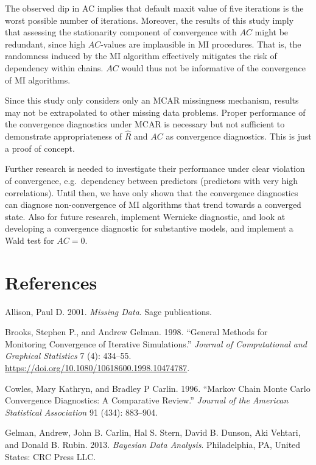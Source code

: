 \documentclass[
  Royal, times, sageapa]{sagej}
\begin{document}
The observed dip in AC implies that default maxit value of five
iterations is the worst possible number of iterations. Moreover, the
results of this study imply that assessing the stationarity component of
convergence with \(AC\) might be redundant, since high \(AC\)-values are
implausible in MI procedures. That is, the randomness induced by the MI
algorithm effectively mitigates the risk of dependency within chains.
\(AC\) would thus not be informative of the convergence of MI
algorithms.

Since this study only considers only an MCAR missingness mechanism,
results may not be extrapolated to other missing data problems. Proper
performance of the convergence diagnostics under MCAR is necessary but
not sufficient to demonstrate appropriateness of \(\widehat{R}\) and
\(AC\) as convergence diagnostics. This is just a proof of concept.

Further research is needed to investigate their performance under clear
violation of convergence, e.g.~dependency between predictors (predictors
with very high correlations). Until then, we have only shown that the
convergence diagnostics can diagnose non-convergence of MI algorithms
that trend towards a converged state. Also for future research,
implement Wernicke diagnostic, and look at developing a convergence
diagnostic for substantive models, and implement a Wald test for
\(AC = 0\).

\hypertarget{references}{%
\section*{References}\label{references}}

\hypertarget{refs}{}
\leavevmode\hypertarget{ref-alli02}{}%
Allison, Paul D. 2001. \emph{Missing Data}. Sage publications.

\leavevmode\hypertarget{ref-broo98}{}%
Brooks, Stephen P., and Andrew Gelman. 1998. ``General Methods for
Monitoring Convergence of Iterative Simulations.'' \emph{Journal of
Computational and Graphical Statistics} 7 (4): 434--55.
\url{https://doi.org/10.1080/10618600.1998.10474787}.

\leavevmode\hypertarget{ref-cowl96}{}%
Cowles, Mary Kathryn, and Bradley P Carlin. 1996. ``Markov Chain Monte
Carlo Convergence Diagnostics: A Comparative Review.'' \emph{Journal of
the American Statistical Association} 91 (434): 883--904.

\leavevmode\hypertarget{ref-gelm13}{}%
Gelman, Andrew, John B. Carlin, Hal S. Stern, David B. Dunson, Aki
Vehtari, and Donald B. Rubin. 2013. \emph{Bayesian Data Analysis}.
Philadelphia, PA, United States: CRC Press LLC.
\end{document}
